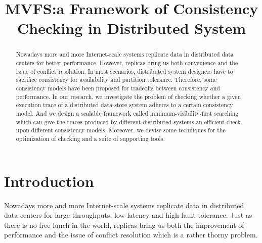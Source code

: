 \documentclass[sigconf,review,screen,anonymous]{acmart}
\begin{document}
\title{MVFS:a Framework of Consistency Checking in Distributed System}

\begin{abstract}
    Nowadays more and more Internet-scale systems replicate data in distributed data centers for better performance. 
    However, replicas bring us both convenience and the issue of conflict resolution. 
    In most scenarios, distributed system designers have to sacrifice consistency for availability and partition tolerance. 
    Therefore, some consistency models have been proposed for tradeoffs between consistency and performance. 
    In our research, we investigate the problem of checking whether a given execution trace of a distributed data-store system adheres to a certain consistency model. 
    And we design a scalable framework called minimum-visibility-first searching which can give the traces produced by different distributed systems an efficient check upon different consistency models. 
    Moreover, we devise some techniques for the optimization of checking and a suite of supporting tools.
\end{abstract}



\maketitle

\section{Introduction}
Nowadays more and more Internet-scale systems replicate data in distributed data centers for large throughputs, low latency and high fault-tolerance. 
Just as there is no free lunch in the world, replicas bring us both the improvement of performance and the issue of conflict resolution which is a rather thorny problem.
\end{document}
